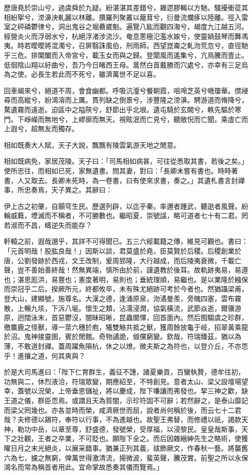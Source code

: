 \begin{pinyinscope}
歷唐堯於崇山兮，過虞舜於九疑。紛湛湛其差錯兮，雜遝膠輵以方馳。騷擾衝蓯其相紛挐兮，滂濞泱軋麗以林離。攢羅列聚叢以蘢茸兮，衍曼流爛痑以陸離。徑入雷室之砰磷鬱律兮，洞出鬼谷之堀礨崴魁。遍覽八紘而觀四海兮，朅度九江越五河。經營炎火而浮弱水兮，杭絕浮渚涉流沙。奄息蔥極氾濫水娭兮，使靈媧鼓琴而舞馮夷。時若曖曖將混濁兮，召屏翳誅風伯，刑雨師。西望崑崙之軋沕荒忽兮，直徑馳乎三危。排閶闔而入帝宮兮，載玉女而與之歸。登閬風而遙集兮，亢鳥騰而壹止。低徊陰山翔以紆曲兮，吾乃今日睹西王母。暠然白首戴勝而穴處兮，亦幸有三足烏為之使。必長生若此而不死兮，雖濟萬世不足以喜。

回車朅來兮，絕道不周，會食幽都。呼吸沆瀣兮餐朝霞，咀唣芝英兮嘰瓊華。僸祲尋而高縱兮，紛鴻溶而上厲。貫列缺之倒景兮，涉豐隆之滂濞。騁游道而脩降兮，騖遺霧而遠逝。迫區中之隘陝兮，舒節出乎北垠。遺屯騎於玄闕兮，軼先驅於寒門。下崢嶸而無地兮，上嵺廓而無天。視眩泯而亡見兮，聽敞怳而亡聞。乘虛亡而上遐兮，超無友而獨存。

相如既奏大人賦，天子大說，飄飄有陵雲氣游天地之閒意。

相如既病免，家居茂陵。天子曰：「司馬相如病甚，可往從悉取其書，若後之矣。」使所忠往，而相如已死，家無遺書。問其妻，對曰：「長卿未嘗有書也。時時著書，人又取去。長卿未死時，為一卷書，曰有使來求書，奏之。」其遺札書言封禪事，所忠奏焉，天子異之。其辭曰：

伊上古之初肇，自顥穹生民。歷選列辟，以迄乎秦。率邇者踵武，聽逖者風聲。紛輪威蕤，堙滅而不稱者，不可勝數也。繼昭夏，崇號諡，略可道者七十有二君。罔若淑而不昌，疇逆失而能存？

軒轅之前，遐哉邈乎，其詳不可得聞已。五三六經載籍之傳，維見可觀也。書曰：「元首明哉！股肱良哉！」因斯以談，君莫盛於堯，臣莫賢於后稷。后稷創業於唐，公劉發跡於西戎，文王改制，爰周郅隆，大行越成，而后陵夷衰微，千載亡聲，豈不善始善終哉！然無異端，慎所由於前，謹遺教於後耳。故軌跡夷易，易遵也；湛恩厖洪，易豐也；憲度著明，易則也；垂統理順，易繼也。是以業隆於繈保而崇冠乎二后。揆厥所元，終都攸卒，未有殊尤絕跡可考於今者也。然猶躡梁甫，登大山，建顯號，施尊名。大漢之德，逢涌原泉，沕潏曼羨，旁魄四塞，雲布霧散，上暢九垓，下泝八埏。懷生之類，沾濡浸潤，協氣橫流，武節焱逝，爾骥游原，迥闊泳末，首惡鬱沒，闇昧昭晰，昆蟲闓懌，回首面內。然后囿騶虞之珍群，徼麋鹿之怪獸，導一莖六穗於庖，犧雙觡共抵之獸，獲周餘放龜于岐，招翠黃乘龍於沼。鬼神接靈圉，賓於閒館。奇物譎詭，俶儻窮變。欽哉，符瑞臻茲，猶以為薄，不敢道封禪。蓋周躍魚隕杭，休之以燎。微夫斯之為符也，以登介丘，不亦恧乎！進攘之道，何其爽與？

於是大司馬進曰：「陛下仁育群生，義征不譓，諸夏樂貢，百蠻執贄，德牟往初，功無與二，休烈液洽，符瑞眾變，期應紹至，不特創見。意者太山、梁父設壇場望幸，蓋號以況榮，上帝垂恩儲祉，將以慶成，陛下嗛讓而弗發也。挈三神之歡，缺王道之儀，群臣恧焉。或謂且天為質闇，示珍符固不可辭；若然辭之，是泰山靡記而梁父罔幾也。亦各並時而榮，咸濟厥世而屈，說者尚何稱於後，而云七十二君哉？夫修德以錫符，奉符以行事，不為進越也。故聖王弗替，而修禮以祇，謁款天神，勒功中岳，以章至尊，舒盛德，發號榮，受厚福，以浸黎民。皇皇哉斯事，天下之壯觀，王者之卒業，不可貶也。願陛下全之。而后因雜縉紳先生之略術，使獲曜日月之末光絕炎，以展采錯事。猶兼正列其義，祓飾厥文，作春秋一藝。將襲舊六為七，攄之無窮，俾萬世得激清流，揚微波，蜚英聲，騰茂實。前聖之所以永保鴻名而常為稱首者用此。宜命掌故悉奏其儀而覽焉。」


\end{pinyinscope}
